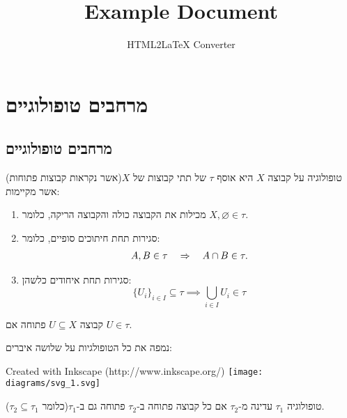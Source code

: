 \documentclass{tstextbook}
\begin{document}
\title{Example Document}
\author{HTML2LaTeX Converter}
\maketitle

\chapter{מרחבים טופולוגיים}

\section{מרחבים טופולוגיים}

\begin{definition}[טופולוגיה]
טופולוגיה על קבוצה \(X\) היא אוסף \(\tau\) של תתי קבוצות של \(X\)(אשר נקראות קבוצות פתוחות) אשר מקיימות:

  \begin{enumerate}
    \item מכילות את הקבוצה כולה והקבוצה הריקה, כלומר \(X,\varnothing  \in \tau\). 


    \item סגירות תחת חיתוכים סופיים, כלומר: 
$$\begin{array}{r l}{A,B\in\tau}&{{}\Rightarrow\quad A\cap B\in\tau.}\end{array}$$


    \item סגירות תחת איחודים כלשהן: 
$$\{U_{i}\}_{i\in I}\subseteq\tau\implies\bigcup_{i\in I}U_{i}\in\tau$$


  \end{enumerate}
\end{definition}
\begin{definition}
קבוצה \(U\subseteq X\) פתוחה אם \(U\in \tau\).

\end{definition}
\begin{example}
נמפה את כל הטופולגיות על שלושה איברים:

 Created with Inkscape (http://www.inkscape.org/) \texttt{[image: diagrams/svg\_1.svg]}
\end{example}
\begin{definition}
טופולוגיה \(\tau_{1}\) עדינה מ-\(\tau_{2}\) אם כל קבוצה פתוחה ב-\(\tau_{2}\) פתוחה גם ב-\(\tau_{1}\)(כלומר \(\tau_{2}\subseteq \tau_{1}\)).

\end{definition}
\end{document}

